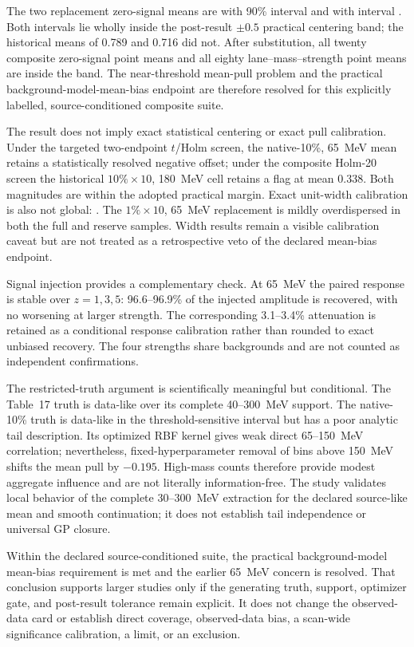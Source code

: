 The two replacement zero-signal means are \VFourPNineOneOnePctMean{} with 90\%
interval \VFourPNineOneOnePctMeanCI{} and \VFourPNineOneNativeTenMean{} with interval
\VFourPNineOneNativeTenMeanCI.  Both intervals lie wholly inside the post-result
$\pm0.5$ practical centering band; the historical means of 0.789 and 0.716 did not.
After substitution, all twenty composite zero-signal point means and all eighty
lane--mass--strength point means are inside the band.  The near-threshold mean-pull
problem and the practical background-model-mean-bias endpoint are therefore resolved
for this explicitly labelled, source-conditioned composite suite.

The result does not imply exact statistical centering or exact pull calibration.
Under the targeted two-endpoint $t$/Holm screen, the native-10\%, 65~MeV mean retains
a statistically resolved negative offset; under the composite Holm-20 screen the
historical $10\%\times10$, 180~MeV cell retains a flag at mean 0.338.  Both magnitudes
are within the adopted practical margin.  Exact unit-width calibration is also not
global: \VFourPNineOneWidthState.  The $1\%\times10$, 65~MeV replacement is mildly
overdispersed in both the full and reserve samples.  Width results remain a visible
calibration caveat but are not treated as a retrospective veto of the declared
mean-bias endpoint.

Signal injection provides a complementary check.  At 65~MeV the paired response is
stable over $z=1,3,5$: 96.6--96.9\% of the injected amplitude is recovered, with no
worsening at larger strength.  The corresponding 3.1--3.4\% attenuation is retained
as a conditional response calibration rather than rounded to exact unbiased
recovery.  The four strengths share backgrounds and are not counted as independent
confirmations.

The restricted-truth argument is scientifically meaningful but conditional.  The
Table~17 truth is data-like over its complete 40--300~MeV support.  The native-10\%
truth is data-like in the threshold-sensitive interval but has a poor analytic tail
description.  Its optimized RBF kernel gives weak direct 65--150~MeV correlation;
nevertheless, fixed-hyperparameter removal of bins above 150~MeV shifts the mean pull
by $-0.195$.  High-mass counts therefore provide modest aggregate influence and are
not literally information-free.  The study validates local behavior of the complete
30--300~MeV extraction for the declared source-like mean and smooth continuation; it
does not establish tail independence or universal GP closure.

Within the declared source-conditioned suite, the practical background-model mean-bias
requirement is met and the earlier 65~MeV concern is resolved.  That conclusion supports
larger studies only if the generating truth, support, optimizer gate, and post-result
tolerance remain explicit.  It does not change the observed-data card or establish
direct \CLs{} coverage, observed-data bias, a scan-wide significance calibration, a
limit, or an exclusion.
